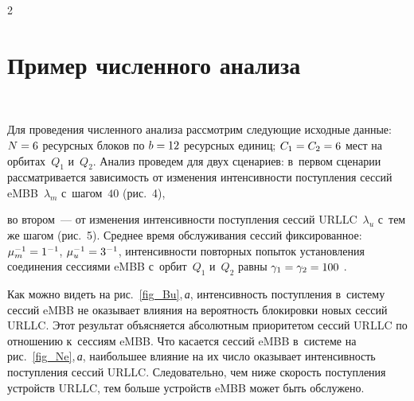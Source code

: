 \begin{multicols}{2}
\section{Пример численного анализа}

\vspace*{-2pt}


\begin{figure*} %
\vspace*{1pt}
 \begin{center}  
 \mbox{%
 \epsfxsize=163mm 
 }
\end{center}
\vspace*{-6pt}
    \label{fig_Bu}
\end{figure*}


Для проведения численного анализа рас\-смот\-рим следующие исходные данные: $N \hm= 6$ 
ресурсных блоков по $b \hm= 12$ ресурсных единиц; $C_1 \hm= C_2 \hm= 6$ мест на 
орбитах~$Q_1$ и~$Q_2$. Анализ проведем для двух сценариев: в~первом сценарии рас\-смат\-ри\-ва\-ет\-ся зависимость 
от изменения  ин\-тен\-сив\-ности поступления  сессий \mbox{eMBB}~$\lambda_{m}$ с~шагом~$40$
(рис.~4),\linebreak\vspace*{-12pt}

\pagebreak

\noindent
 во втором~--- от 
изменения интенсивности поступления сессий URLLC~$\lambda_{u}$ с~тем же шагом
(рис.~5). Среднее время 
обслуживания сессий фиксированное: $\mu_{{m}}^{- 1} \hm= 1^{- 1}$, $\mu_{{u }}^{- 1} 
\hm= 3^{- 1}$, интенсивности повторных попыток установления соединения сессиями \mbox{eMBB} с~орбит~$Q_1$ и~$Q_2$ 
равны $\gamma_1 \hm= \gamma_2 \hm= 100$ .

Как можно видеть на рис.~\ref{fig_Bu},\,\textit{а}, интенсивность поступления в~систему сессий 
\mbox{eMBB} не оказывает влияния на вероятность блокировки новых сессий URLLC. Этот результат объясняется 
абсолютным приоритетом сессий URLLC по отношению к~сессиям \mbox{eMBB}. Что касается сессий \mbox{eMBB} в~системе 
на рис.~\ref{fig_Ne},\,\textit{а}, наибольшее влияние на их число оказывает интенсивность поступления сессий URLLC. 
Следовательно, чем ниже скорость поступления устройств URLLC, тем больше устройств \mbox{eMBB} может быть 
обслужено.


\end{multicols}
